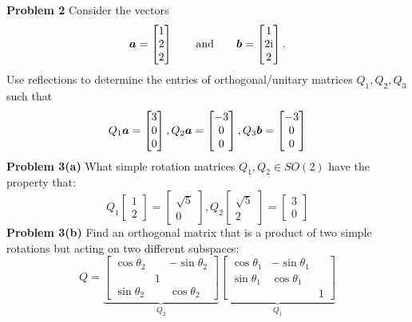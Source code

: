 \documentclass[12pt,a4paper]{article}
\def\a{ {\vc a} }
\def\b{ {\vc b} }
\begin{document}
\textbf{Problem 2} Consider the vectors
\[
\ensuremath{\bm{\a}} = \begin{bmatrix} 1 \\ 2 \\ 2 \end{bmatrix}\qquad\hbox{and}\qquad  \ensuremath{\bm{\b}} = \begin{bmatrix} 1 \\ 2{\rm i} \\ 2 \end{bmatrix}.
\]
Use reflections to determine the entries of orthogonal/unitary matrices $Q_1, Q_2, Q_3$ such that
\[
Q_1 \ensuremath{\bm{\a}} = \begin{bmatrix} 3 \\ 0 \\ 0 \end{bmatrix}, Q_2 \ensuremath{\bm{\a}} = \begin{bmatrix} -3 \\ 0 \\ 0 \end{bmatrix},
Q_3 \ensuremath{\bm{\b}} = \begin{bmatrix} -3 \\ 0 \\ 0 \end{bmatrix}
\]
\textbf{Problem 3(a)} What simple rotation matrices $Q_1,Q_2 \ensuremath{\in} SO(2)$ have the property that:
\[
Q_1 \begin{bmatrix} 1 \\ 2 \end{bmatrix} =\begin{bmatrix} \sqrt{5} \\ 0 \end{bmatrix},  Q_2 \begin{bmatrix} \sqrt{5} \\ 2 \end{bmatrix} =  \begin{bmatrix} 3 \\ 0 \end{bmatrix}
\]
\textbf{Problem 3(b)} Find an orthogonal matrix that is a product of two simple rotations but acting on two different subspaces:
\[
Q  = \underbrace{\begin{bmatrix} \cos \ensuremath{\theta}_2 & & -\sin \ensuremath{\theta}_2  \\ & 1 \\
\sin \ensuremath{\theta}_2  & & \cos \ensuremath{\theta}_2  \end{bmatrix}}_{Q_2} \underbrace{\begin{bmatrix} \cos \ensuremath{\theta}_1 & -\sin \ensuremath{\theta}_1  \\ \sin \ensuremath{\theta}_1 & \cos \ensuremath{\theta}_1 \\ && 1 \end{bmatrix}}_{Q_1}
\]
\end{document}
